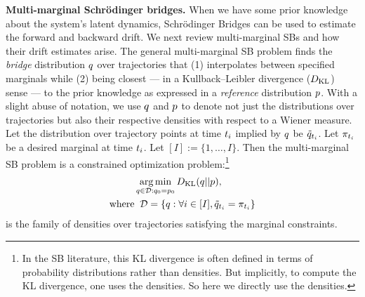\textbf{Multi-marginal Schrödinger bridges.}
When we have some prior knowledge about the system's latent dynamics, Schrödinger Bridges \citep[SBs,][]{Wang2023, Vargas2021, lavenant2024toward} can be used to estimate the forward and backward drift. We next review multi-marginal SBs and how their drift estimates arise. The general multi-marginal SB problem \citep{chen2019multi, lavenant2024toward} finds the \emph{bridge} distribution $q$ over trajectories that (1) interpolates between specified marginals while (2) being closest --- in a Kullback--Leibler divergence ($D_{\mathrm{KL}}$) sense --- to the prior knowledge as expressed in a \emph{reference} distribution $p$. With a slight abuse of notation, we use $q$ and $p$ to denote not just the distributions over trajectories but also their respective densities with respect to a Wiener measure. Let the distribution over trajectory points at time $t_{i}$ implied by $q$ be $\tilde{q}_{t_{i}}$. Let $\pi_{t_{i}}$ be a desired marginal at time $t_{i}$. Let $[I] := \{1,\ldots, I\}$. Then the multi-marginal SB problem is a constrained optimization problem:\footnote{In the SB literature, this KL divergence is often defined in terms of probability distributions rather than densities. But implicitly, to compute the KL divergence, one uses the densities. So here we directly use the densities.} 
\begin{align}
    \label{eq:SBP-main}
    & \operatorname*{arg\,min}_{q\in \mathcal{D}: q_0=p_0}D_{\mathrm{KL}}(q||p), \\
    \label{eq:measure-family}
    \textrm{where} & \;\; \mathcal{D}=\left\{q:\forall i \in [I], \tilde{q}_{t_{i}}=\pi_{t_{i}} \right\}
\end{align}
is the family of densities over trajectories satisfying the marginal constraints.

